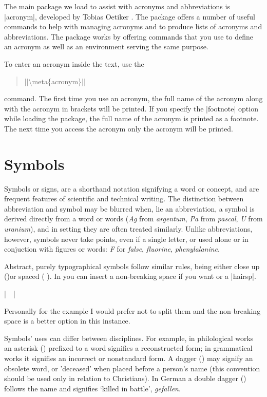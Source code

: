 The main package we load to assist with acronyms and abbreviations is |acronym|, developed by Tobias Oetiker \citeyearpar{acronym}. The package offers a number of useful commands to help with managing acronyms and to produce lists of acronyms and abbreviations. The package works by offering commands that you use to define an acronym as well as an environment serving the same purpose.

\DescribeMacro{\ac}
    To enter an acronym inside the text, use the
    \begin{quote}
     |\ac{|\meta{acronym}|}|
    \end{quote}
    command. The first time you use an acronym, the full name of the
    acronym along with the acronym in brackets will be printed. If you
    specify the |footnote| option while loading the package, the full
    name of the acronym is printed as a footnote.
    The next time you access the acronym only the acronym will
    be printed.

\section{Symbols}

Symbols or signs, are a shorthand notation signifying a word or concept, and are frequent features of scientific and technical writing. The distinction between abbreviation and symbol may be blurred when, lie an abbreviation, a symbol is derived directly from a word or words (\textit{Ag} from \textit{argentum}, \textit{Pa} from \textit{pascal}, \textit{U} from \textit{uranium}), and in setting they are often treated similarly. Unlike abbreviations, however, symbols never take points, even if a single letter, or used alone or in conjuction with figures or words: \textit{F}  for \textit{false}, \textit{fluorine}, \textit{phenylalanine}.

Abstract, purely typographical symbols follow similar rules, being either close up ()or spaced (  ). In \latex you can insert a non-breaking space if you want or a |hairsp|.

|~~|

Personally for the example I would prefer not to split them and the non-breaking space is a better option in this instance.

Symbols' uses can differ between disciplines. For example, in philological
works an asterisk (\textasteriskcentered) prefixed to a word signifies a reconstructed
form; in grammatical works it signifies an incorrect or nonstandard
form. A dagger (\textdagger) may signify an obsolete word, or 'deceased' when
placed before a person's name (this convention should be used only in
relation to Christians). In German a double dagger (\textdaggerdbl) follows the name
and signifies `killed in battle', \textit{gefallen}.

